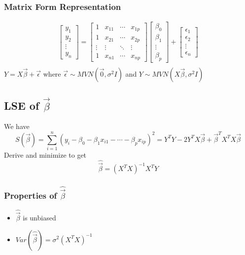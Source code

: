 \documentclass[11pt]{article}
\newcommand{\cv}[1]{\begin{bmatrix} #1 \end{bmatrix}}
\begin{document}
\subsubsection{Matrix Form Representation}
\begin{align*}
    \cv{y_1\\y_2\\\vdots\\y_n} = \cv{1&x_{11}&\cdots&x_{1p} \\ 1&x_{21}&\cdots&x_{2p} \\ \vdots&\vdots&\ddots&\vdots \\ 1&x_{n1}&\cdots&x_{np}}\cv{\beta_0\\\beta_1\\\vdots\\\beta_p}+\cv{\epsilon_1\\\epsilon_2\\\vdots\\\epsilon_n} \\
\end{align*}
$Y=X\vec{\beta}+\vec{\epsilon}$ where $\vec{\epsilon}\sim MVN(\vec{0},\sigma^2I)$ and $Y\sim MVN(X\vec{\beta},\sigma^2I)$
\subsection{LSE of $\vec{\beta}$}
We have \[S(\vec{\beta})=\sum_{i=1}^{n}(y_i-\beta_0-\beta_1x_{i1}-\cdots-\beta_px_{ip})^2 = Y^TY-2Y^TX\vec{\beta}+\vec{\beta}^TX^TX\vec{\beta}\]
Derive and minimize to get \[\hat{\vec{\beta}}=(X^TX)^{-1}X^TY\]
\subsubsection{Properties of $\hat{\vec{\beta}}$}
\begin{itemize}
    \item $\hat{\vec{\beta}}$ is unbiased 
    \item $Var(\hat{\vec{\beta}})=\sigma^2(X^TX)^{-1}$
\end{itemize}
\end{document}
